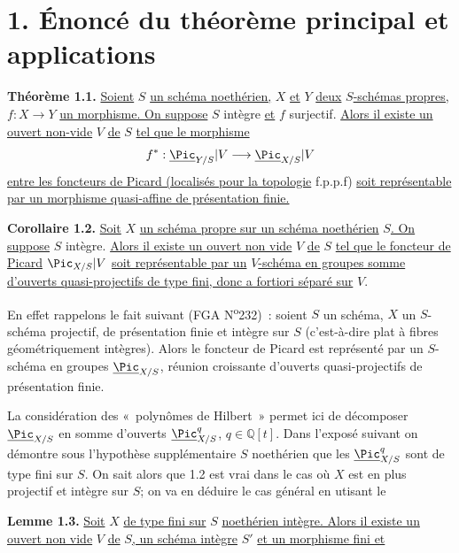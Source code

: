 
\section*{1. Énoncé du théorème principal et applications}

\textbf{Théorème 1.1.} \uline{Soient} \(S\) \uline{un schéma noethérien,} \(X\) \uline{et} \(Y\) \uline{deux} \(S\)\uline{-schémas propres,} \(f:X\to Y\) \uline{un morphisme. On suppose} \(S\) intègre \uline{et} \(f\) surjectif. \uline{Alors il existe un ouvert non-vide} \(V\) \uline{de} \(S\) \uline{tel que le morphisme}
\[
  f^*:\underline{\Pic}_{Y/S}|V\longrightarrow \underline{\Pic}_{X/S}|V
\]
\uline{entre les foncteurs de Picard (localisés pour la topologie} f.p.p.f) \uline{soit représentable par un morphisme quasi-affine de présentation finie.}

\textbf{Corollaire 1.2.} \uline{Soit} \(X\) \uline{un schéma propre sur un schéma noethérien} \(S\)\uline{. On suppose} \(S\) intègre. \uline{Alors il existe un ouvert non vide} \(V\) \uline{de} \(S\) \uline{tel que le foncteur de Picard} \(\Pic_{X/S}|V\) \uline{soit représentable par un} \(V\)\uline{-schéma en groupes somme d'ouverts quasi-projectifs de type fini, donc a fortiori séparé sur} \(V\).

En effet rappelons le fait suivant (FGA N\textsuperscript{o}232)~: soient \(S\) un schéma, \(X\) un \(S\)-schéma projectif, de présentation finie et intègre sur \(S\) (c'est-à-dire plat à fibres géométriquement intègres). Alors le foncteur de Picard est représenté par un \(S\)-schéma en groupes \(\underline{\Pic}_{X/S}\), réunion croissante d'ouverts quasi-projectifs de présentation finie.

La considération des «~polynômes de Hilbert~» permet ici de décomposer \(\underline{\Pic}_{X/S}\) en somme d'ouverts \(\underline{\Pic}^q_{X/S}\), \(q\in\mathbb Q[t]\). Dans l'exposé suivant on démontre sous l'hypothèse supplémentaire \(S\) noethérien que les \(\underline{\Pic}^q_{X/S}\) sont de type fini sur \(S\). On sait alors que 1.2 est vrai dans le cas où \(X\) est en plus projectif et intègre sur \(S\); on va en déduire le cas général en utisant le

\textbf{Lemme 1.3.} \uline{Soit} \(X\) \uline{de type fini sur} \(S\) \uline{noethérien intègre. Alors il existe un ouvert non vide} \(V\) \uline{de} \(S\)\uline{, un schéma intègre} \(S'\) \uline{et un morphisme fini et}
